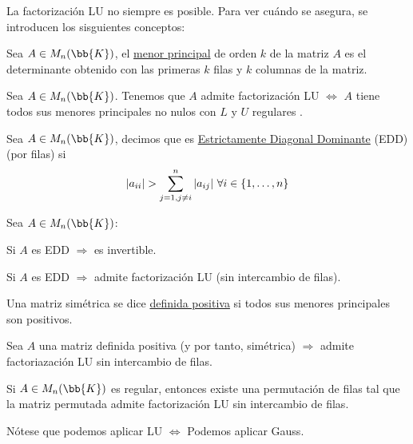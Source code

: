 La factorización LU no siempre es posible. Para ver cuándo se asegura, se introducen los sisguientes conceptos:

\begin{definicion}
    Sea $A \in M_n(\bb{K})$, el \underline{menor principal} de orden $k$ de la matriz $A$ es el determinante obtenido con
    las primeras $k$ filas y $k$ columnas de la matriz.
\end{definicion}

\begin{prop}
    Sea $A \in M_n(\bb{K})$. Tenemos que $A$ admite factorización LU $\Longleftrightarrow$ $A$ tiene todos sus menores principales no nulos con $L$ y $U$ regulares  .
\end{prop}

\begin{definicion}[EDD]
    Sea $A \in M_n(\bb{K})$, decimos que es \underline{Estrictamente Diagonal Dominante} (EDD) (por filas) si
    $$|a_{ii}|>\sum_{j=1,j\neq i}^n |a_{ij}| \ \todoi$$
\end{definicion}

\begin{prop}
    Sea $A \in M_n(\bb{K})$:

    Si $A$ es EDD $\Rightarrow$ es invertible.

    Si $A$ es EDD $\Rightarrow$ admite factorización LU (sin intercambio de filas).
\end{prop}

\begin{definicion}
    Una matriz simétrica se dice \underline{definida positiva} si todos sus menores principales son positivos.
\end{definicion}

\begin{prop}
    Sea $A$ una matriz definida positiva (y por tanto, simétrica) $\Rightarrow$ admite factoriazación LU sin intercambio
    de filas.
\end{prop}

\begin{teo}
    Si $A \in M_n(\bb{K})$ es regular, entonces existe una permutación de filas tal que la matriz permutada admite factorización
    LU sin intercambio de filas.
\end{teo}

Nótese que podemos aplicar LU $\Leftrightarrow$ Podemos aplicar Gauss.

